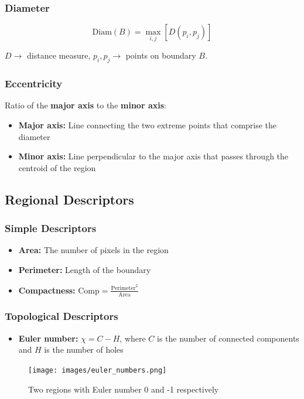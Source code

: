\subsubsection*{Diameter}

\begin{equation*}
  \text{Diam}(B) = \max_{i, j}[D(p_i, p_j)]
\end{equation*}

$D \rightarrow$ distance measure, $p_i, p_j \rightarrow$ points on boundary $B$.

\subsubsection*{Eccentricity}

Ratio of the \textbf{major axis} to the \textbf{minor axis}:

\begin{itemize}
  \item \textbf{Major axis:} Line connecting the two extreme points
    that comprise the diameter
  \item \textbf{Minor axis:} Line perpendicular to the major axis
    that passes through the centroid of the region
\end{itemize}

\subsection*{Regional Descriptors}

\subsubsection*{Simple Descriptors}

\begin{itemize}
  \item \textbf{Area:} The number of pixels in the region
  \item \textbf{Perimeter:} Length of the boundary
  \item \textbf{Compactness:} $\text{Comp} =
    \frac{\text{Perimeter}^2}{\text{Area}}$

\end{itemize}

\subsubsection*{Topological Descriptors}

\begin{itemize}
  \item \textbf{Euler number:} $\chi = C - H$, where $C$ is the
    number of connected components and $H$ is the number of holes
\end{itemize}

\begin{figure}[H]
  \centering
  \texttt{[image: images/euler\_numbers.png]}
  \caption{Two regions with Euler number 0 and -1 respectively}
\end{figure}
